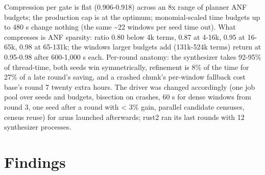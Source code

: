 \documentclass[10pt,a4paper]{article}
\begin{document}
Compression per gate is flat (0.906-0.918) across an 8x range of planner ANF budgets; the production cap is at the optimum; monomial-scaled time budgets up to 480 s change nothing (the same \textasciitilde{}22 windows per seed time out). What compresses is ANF sparsity: ratio 0.80 below 4k terms, 0.87 at 4-16k, 0.95 at 16-65k, 0.98 at 65-131k; the windows larger budgets add (131k-524k terms) return at 0.95-0.98 after 600-1,000 s each. Per-round anatomy: the synthesizer takes 92-95\% of thread-time, both seeds win symmetrically, refinement is 8\% of the time for 27\% of a late round's saving, and a crashed chunk's per-window fallback cost base's round 7 twenty extra hours. The driver was changed accordingly (one job pool over seeds and budgets, bisection on crashes, 60 s for dense windows from round 3, one seed after a round with \textless{} 3\% gain, parallel candidate censuses, census reuse) for arms launched afterwards; rust2 ran its last rounds with 12 synthesizer processes.

\section{Findings}
\end{document}
